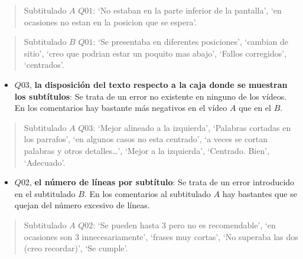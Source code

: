 \documentclass[
  12pt,
  a4paper,
  extrafontsizes,
  onecolumn,
  openright,
  table]{memoir}
\providecommand{\tightlist}{%
  \setlength{\itemsep}{0pt}\setlength{\parskip}{0pt}}\usepackage{longtable,booktabs,array}
\begin{document}
\begin{quote}
Subtitulado \(A\) \(Q01\): \enquote*{No estaban en la parte inferior de
la pantalla}, \enquote*{en ocasiones no estan en la posicion que se
espera}. \color{black} \normalsize
\end{quote}

\scriptsize
\color{red}

\begin{quote}
Subtitulado \(B\) \(Q01\): \enquote*{Se presentaba en diferentes
posiciones}, \enquote*{cambian de sitio}, \enquote*{creo que podrian
estar un poquito mas abajo}, \enquote*{Fallos corregidos},
\enquote*{centrados}.
\end{quote}

\color{black}

\normalsize

\begin{itemize}
\tightlist
\item
  \(Q03\), \textbf{la disposición del texto respecto a la caja donde se
  muestran los subtítulos}: Se trata de un error no existente en ninguno
  de los vídeos. En los comentarios hay bastante más negativos en el
  vídeo \(A\) que en el \(B\).
\end{itemize}

\scriptsize
\color{blue}

\begin{quote}
Subtitulado \(A\) \(Q03\): \enquote*{Mejor alineado a la izquierda},
\enquote*{Palabras cortadas en los parrafos}, \enquote*{en algunos casos
no esta centrado}, \enquote*{a veces se cortan palabras y otros
detalles\ldots{}}, \enquote*{Mejor a la izquierda}, \enquote*{Centrado.
Bien}, \enquote*{Adecuado}.
\end{quote}

\color{black}
\normalsize

\begin{itemize}
\tightlist
\item
  \(Q02\), \textbf{el número de líneas por subtítulo}: Se trata de un
  error introducido en el subtitulado \(B\). En los comentarios al
  subtitulado \(A\) hay bastantes que se quejan del número excesivo de
  líneas.
\end{itemize}

\scriptsize
\color{blue}

\begin{quote}
Subtitulado \(A\) \(Q02\): \enquote*{Se pueden hasta 3 pero no es
recomendable}, \enquote*{en ocasiones son 3 innecesariamente},
\enquote*{frases muy cortas}, \enquote*{No superaba las dos (creo
recordar)}, \enquote*{Se cumple}.
\end{quote}
\end{document}
